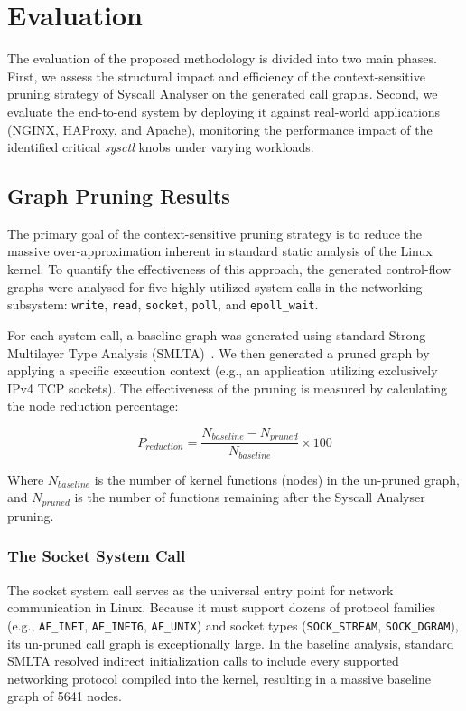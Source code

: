 \chapter{Evaluation} \label{ch:evaluation}

The evaluation of the proposed methodology is divided into two main phases.
First, we assess the structural impact and efficiency of the context-sensitive pruning strategy of Syscall Analyser on the generated call graphs.
Second, we evaluate the end-to-end system by deploying it against real-world applications (NGINX, HAProxy, and Apache), monitoring the performance impact of the identified critical \textit{sysctl} knobs under varying workloads.

\section{Graph Pruning Results}

The primary goal of the context-sensitive pruning strategy is to reduce the massive over-approximation inherent in standard static analysis of the Linux kernel.
To quantify the effectiveness of this approach, the generated control-flow graphs were analysed for five highly utilized system calls in the networking subsystem: \texttt{write}, \texttt{read}, \texttt{socket}, \texttt{poll}, and \texttt{epoll\_wait}.

For each system call, a baseline graph was generated using standard Strong Multilayer Type Analysis (SMLTA)~\cite{smlta}.
We then generated a pruned graph by applying a specific execution context (e.g., an application utilizing exclusively IPv4 TCP sockets).
The effectiveness of the pruning is measured by calculating the node reduction percentage:

\[P_{reduction} = \frac{N_{baseline} - N_{pruned}}{N_{baseline}} \times 100\]

Where $N_{baseline}$ is the number of kernel functions (nodes) in the un-pruned graph, and $N_{pruned}$ is the number of functions remaining after the Syscall Analyser pruning.

\subsection{The Socket System Call}

The socket system call serves as the universal entry point for network communication in Linux.
Because it must support dozens of protocol families (e.g., \texttt{AF\_INET}, \texttt{AF\_INET6}, \texttt{AF\_UNIX}) and socket types (\texttt{SOCK\_STREAM}, \texttt{SOCK\_DGRAM}), its un-pruned call graph is exceptionally large.
In the baseline analysis, standard SMLTA resolved indirect initialization calls to include every supported networking protocol compiled into the kernel, resulting in a massive baseline graph of 5641 nodes.

